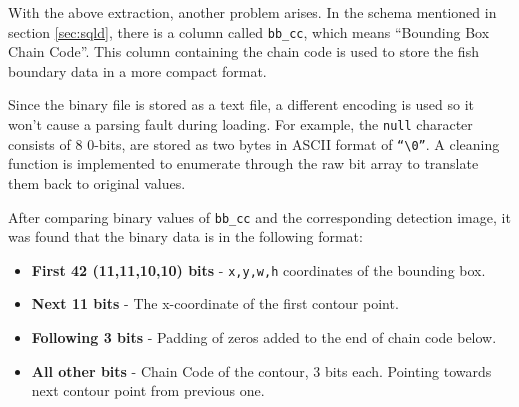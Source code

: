 \documentclass[bsc,logo,twoside,fullspacing,parskip]{infthesis}
\begin{document}
With the above extraction, another problem arises. 
In the schema mentioned in section \ref{sec:sqld}, there is a column called {\tt bb\_cc}, which means ``Bounding Box Chain Code''. 
This column containing the chain code is used to store the fish boundary data in a more compact format.

Since the binary file is stored as a text file, a different encoding is used so it won't cause a parsing fault during loading.
For example, the {\tt null} character consists of 8 0-bits, are stored as two bytes in ASCII format of {\tt ``\textbackslash0''}. A cleaning function is implemented to enumerate through the raw bit array to translate them back to original values.

After comparing binary values of {\tt bb\_cc} and the corresponding detection image, it was found that the binary data is in the following format:
\begin{itemize}
\setlength{\parskip}{1pt}
\item
\textbf{First 42 (11,11,10,10) bits} - {\tt x,y,w,h} coordinates of the bounding box.
\item
\textbf{Next 11 bits} - The x-coordinate of the first contour point.
\item
\textbf{Following 3 bits} - Padding of zeros added to the end of chain code below.
\item
\textbf{All other bits} - Chain Code of the contour, 3 bits each. Pointing towards next contour point from previous one. 
\end{itemize}

\begin{center}
\vspace{-10pt}
\vspace{5pt}
\end{center}
\end{document}
